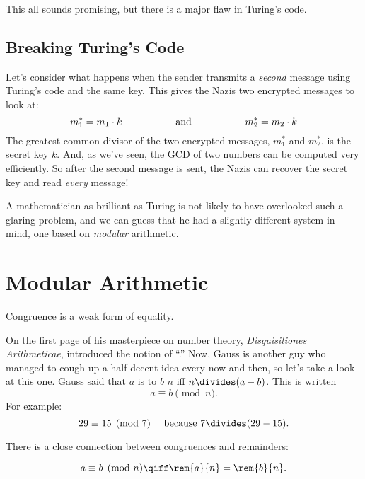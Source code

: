 This all sounds promising, but there is a major flaw in Turing's code.

\subsection{Breaking Turing's Code}

Let's consider what happens when the sender transmits a \emph{second} message using
Turing's code and the same key.  This gives the Nazis two encrypted messages to look at:
\[
m_1^* = m_1 \cdot k
\hspace{0.75in} \text{and} \hspace{0.75in} m_2^* = m_2 \cdot k
\]
The greatest common divisor of the two encrypted messages, $m_1^*$ and $m_2^*$, is the
secret key $k$.  And, as we've seen, the GCD of two numbers can be computed very
efficiently.  So after the second message is sent, the Nazis can recover the secret key and
read \emph{every} message!

A mathematician as brilliant as Turing is not likely to have overlooked such a glaring
problem, and we can guess that he had a slightly different system in mind, one based on
\emph{modular} arithmetic.


\section{Modular Arithmetic}
\label{modular_arithmeric_sec}

\begin{editingnotes}
Congruence is a weak form of equality.
\end{editingnotes}

On the first page of his masterpiece on number theory, \emph{Disquisitiones Arithmeticae},
 introduced the notion of ``.''  Now, Gauss is another guy who
managed to cough up a half-decent idea every now and then, so let's take a look at this
one.  Gauss said that $a$ is  to $b$  $n$ iff $n \divides (a -
b)$.  This is written 
\[
a \equiv b \pmod{n}.
\]
For example:
\[
29 \equiv 15 \pmod{7} \quad\text{ because } 7 \divides (29 - 15).
\]

There is a close connection between congruences and remainders:
\begin{lemma}[Remainder]
\label{lem:conrem}
\[
a \equiv b \pmod{n} \qiff \rem{a}{n} = \rem{b}{n}.
\]
\end{lemma}

